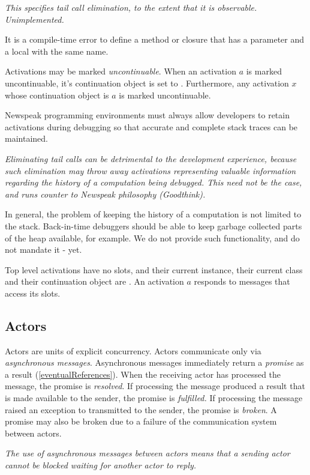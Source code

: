 \documentclass{article}
\begin{document}
{\it This specifies tail call elimination, to the extent that it is observable. Unimplemented. 
}

It is a compile-time error to define a method or closure that has a parameter and a local with the same name.

Activations may be marked {\em uncontinuable}.
When an activation $a$ is marked uncontinuable, it's continuation object is set to \NIL{}.
Furthermore, any activation $x$ whose continuation object is $a$ is marked uncontinuable.


Newspeak programming environments must always allow developers to retain activations during debugging so that accurate and complete stack traces can be maintained. 

{\it 
Eliminating tail calls can be detrimental to the development experience, because such elimination may throw away activations representing valuable information regarding the history of a computation being debugged. This need not be the case, and runs counter to Newspeak philosophy (Goodthink).

In general, the
problem of keeping the history of a computation is not limited to the stack. Back-in-time debuggers
should be able to keep garbage collected parts of the heap available, for example. We do not provide such
functionality, and do not mandate it - yet.
}

Top level activations have no slots, and  their current instance, their current class and their continuation object are \NIL{}.
An activation $a$ responds to messages that access its slots. 




\subsection{Actors}
\label{actors}

Actors are units of explicit concurrency.  Actors communicate only via {\em asynchronous messages}.  Asynchronous messages immediately return a {\em promise} as a result (\ref{eventualReferences}).  When the receiving actor has processed the message, the promise is {\em resolved}. If processing the message produced a result that is made available to the sender, the promise is {\em fulfilled.} If processing the message raised an exception to transmitted to the sender, the promise is {\em broken}.  A promise may also be broken due to a failure of the communication system between actors.

{\it The use of asynchronous messages between actors means that a sending actor cannot be blocked waiting for another actor to reply.
}
\end{document}
